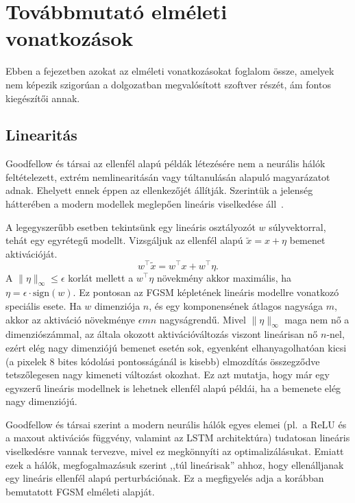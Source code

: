 \section{Továbbmutató elméleti vonatkozások}
Ebben a fejezetben azokat az elméleti vonatkozásokat foglalom össze, amelyek nem képezik szigorúan a dolgozatban megvalósított 
szoftver részét, ám fontos kiegészítői annak. 

\subsection{Linearitás}
\label{sec:linearity}
Goodfellow és társai az ellenfél alapú példák létezésére nem a neurális hálók feltételezett, extrém nemlinearitásán vagy 
túltanulásán alapuló magyarázatot adnak. 
Ehelyett ennek éppen az ellenkezőjét állítják. 
Szerintük a jelenség hátterében a modern modellek meglepően lineáris viselkedése áll~\cite{goodfellow2015explaining}. 

A legegyszerűbb esetben tekintsünk egy lineáris osztályozót $w$ súlyvektorral, tehát egy egyrétegű modellt. 
Vizsgáljuk az ellenfél alapú $\tilde{x} = x + \eta$ bemenet aktivációját. 
\[
  w^\top \tilde{x} = w^\top x + w^\top \eta.
\]
A $\|\eta\|_\infty \leq \epsilon$ korlát mellett a $w^\top \eta$ növekmény akkor maximális, ha $\eta = \epsilon \cdot 
\mathrm{sign}(w)$. 
Ez pontosan az FGSM képletének lineáris modellre vonatkozó speciális esete. 
Ha $w$ dimenziója $n$, és egy komponensének átlagos nagysága $m$, akkor az aktiváció növekménye $\epsilon m n$ nagyságrendű. 
Mivel $\|\eta\|_\infty$ maga nem nő a dimenziószámmal, az általa okozott aktivációváltozás viszont lineárisan nő $n$-nel, ezért 
elég nagy dimenziójú bemenet esetén sok, egyenként elhanyagolhatóan kicsi (a pixelek $8$ bites kódolási pontosságánál is kisebb) 
elmozdítás összegződve tetszőlegesen nagy kimeneti változást okozhat. 
Ez azt mutatja, hogy már egy egyszerű lineáris modellnek is lehetnek ellenfél alapú példái, ha a bemenete elég nagy dimenziójú. 

Goodfellow és társai szerint a modern neurális hálók egyes elemei (pl.\ a ReLU és a maxout aktivációs függvény, valamint az 
LSTM architektúra) tudatosan lineáris viselkedésre vannak tervezve, mivel ez megkönnyíti az optimalizálásukat. 
Emiatt ezek a hálók, megfogalmazásuk szerint ,,túl lineárisak'' ahhoz, hogy ellenálljanak egy lineáris ellenfél alapú 
perturbációnak. 
Ez a megfigyelés adja a korábban bemutatott FGSM elméleti alapját. 

